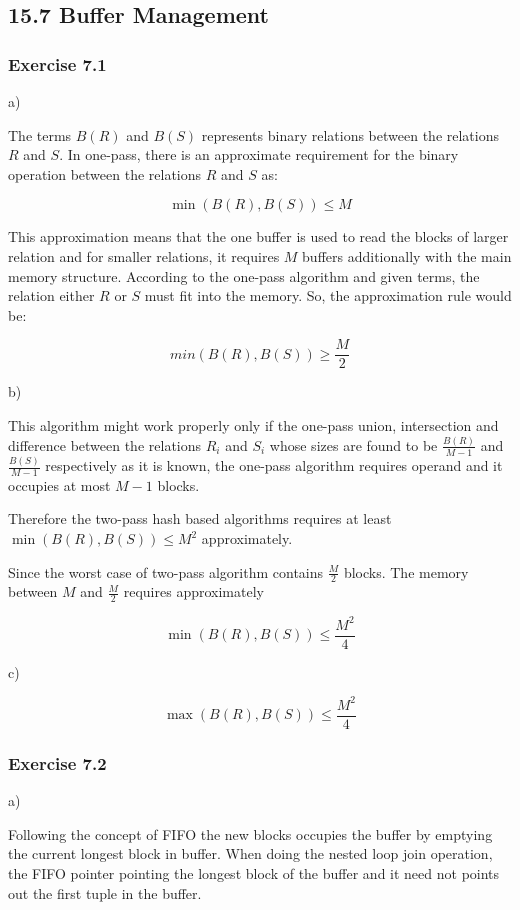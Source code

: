 \documentclass[../../main.tex]{subfiles}
\begin{document}
\subsection{15.7 Buffer Management}

\subsubsection*{Exercise 7.1}

a)

The terms $B(R)$ and $B(S)$ represents binary relations between the relations
$R$ and $S$. In one-pass, there is an approximate requirement for the binary
operation between the relations $R$ and $S$ as:

$$
\min(B(R), B(S)) \leq M
$$

This approximation means that the one buffer is used to read the blocks
of larger relation and for smaller relations, it requires $M$ buffers
additionally with the main memory structure. According to the one-pass
algorithm and given terms, the relation either $R$ or $S$ must fit into the
memory. So, the approximation rule would be:

$$
min(B(R), B(S)) \geq \frac{M}{2}
$$


b)

This algorithm might work properly only if the one-pass union,
intersection and difference between the relations $R_{i}$ and $S_{i}$
whose sizes are found to be $\frac{B(R)}{M - 1}$ and $\frac{B(S)}{M - 1}$
respectively as it is known, the one-pass algorithm requires
operand and it occupies at most  $M - 1$ blocks.

Therefore the two-pass hash based algorithms requires at least
$\min(B(R), B(S)) \leq M^{2}$ approximately.

Since the worst case of two-pass algorithm contains $\frac{M}{2}$
blocks. The memory between $M$ and $\frac{M}{2}$ requires approximately

$$
\min(B(R), B(S)) \leq \frac{M^2}{4}
$$

c)

$$
\max(B(R), B(S)) \leq \frac{M^2}{4}
$$

\subsubsection*{Exercise 7.2}

a)

Following the concept of FIFO the new blocks occupies the buffer by
emptying the current longest block in buffer. When doing the nested loop
join operation, the FIFO pointer pointing the longest block of the buffer
and it need not points out the first tuple in the buffer.
\end{document}
